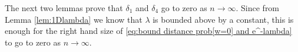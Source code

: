 
	The next two lemmas prove that $\delta_1$ and $\delta_4$ go to zero as $n \rightarrow \infty$. Since from Lemma \ref{lem:1Dlambda} we know that $\lambda$ is bounded above by a constant, this is enough for the right hand size of \eqref{eq:bound distance prob[w=0] and e^-lambda} to go to zero as $n \rightarrow \infty$.

